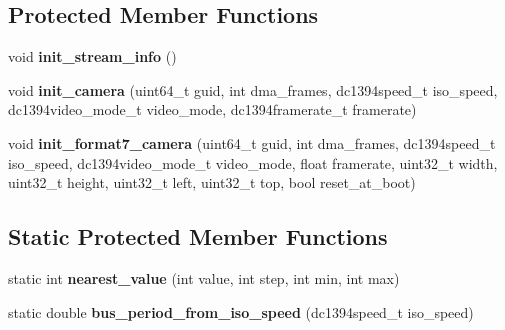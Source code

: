 \subsection*{Protected Member Functions}
\begin{DoxyCompactItemize}
\item 
void {\bfseries init\+\_\+stream\+\_\+info} ()\hypertarget{classpangolin_1_1_firewire_video_af566d3aa8b37cdeb11e31f8be52e6021}{}\label{classpangolin_1_1_firewire_video_af566d3aa8b37cdeb11e31f8be52e6021}

\item 
void {\bfseries init\+\_\+camera} (uint64\+\_\+t guid, int dma\+\_\+frames, dc1394speed\+\_\+t iso\+\_\+speed, dc1394video\+\_\+mode\+\_\+t video\+\_\+mode, dc1394framerate\+\_\+t framerate)\hypertarget{classpangolin_1_1_firewire_video_a65a81792a5108644a08053f57a7f4f36}{}\label{classpangolin_1_1_firewire_video_a65a81792a5108644a08053f57a7f4f36}

\item 
void {\bfseries init\+\_\+format7\+\_\+camera} (uint64\+\_\+t guid, int dma\+\_\+frames, dc1394speed\+\_\+t iso\+\_\+speed, dc1394video\+\_\+mode\+\_\+t video\+\_\+mode, float framerate, uint32\+\_\+t width, uint32\+\_\+t height, uint32\+\_\+t left, uint32\+\_\+t top, bool reset\+\_\+at\+\_\+boot)\hypertarget{classpangolin_1_1_firewire_video_a9941c6915a9d099a09a90c0ee4f8889f}{}\label{classpangolin_1_1_firewire_video_a9941c6915a9d099a09a90c0ee4f8889f}

\end{DoxyCompactItemize}
\subsection*{Static Protected Member Functions}
\begin{DoxyCompactItemize}
\item 
static int {\bfseries nearest\+\_\+value} (int value, int step, int min, int max)\hypertarget{classpangolin_1_1_firewire_video_ac6ae940b361f0a33757bb420fcd5d2fa}{}\label{classpangolin_1_1_firewire_video_ac6ae940b361f0a33757bb420fcd5d2fa}

\item 
static double {\bfseries bus\+\_\+period\+\_\+from\+\_\+iso\+\_\+speed} (dc1394speed\+\_\+t iso\+\_\+speed)\hypertarget{classpangolin_1_1_firewire_video_a566c1d07d6539ebbfbb11cf567f69fb0}{}\label{classpangolin_1_1_firewire_video_a566c1d07d6539ebbfbb11cf567f69fb0}

\end{DoxyCompactItemize}
